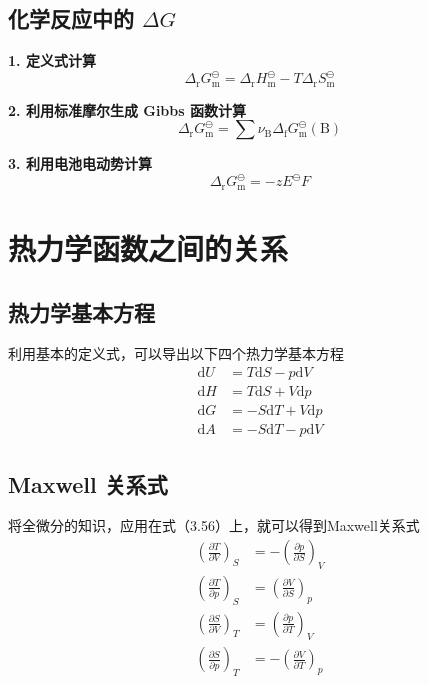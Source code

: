 \documentclass[lang=cn,newtx,10pt,scheme=chinese]{elegantbook}
\begin{document}
\subsection{化学反应中的 $\Delta G$}
\textbf{1. 定义式计算}
\begin{equation}
	\Delta_\mathrm{r}G^\ominus_\mathrm{m} = \Delta_\mathrm{r}H^\ominus_\mathrm{m}-T\Delta_\mathrm{r}S^\ominus_\mathrm{m}
\end{equation}

\textbf{2. 利用标准摩尔生成 Gibbs 函数计算}
\begin{equation}
	\Delta_\mathrm{r}G^\ominus _\mathrm{m}=\sum \nu _\mathrm{B}\Delta _\mathrm{f}G^\ominus _\mathrm{m}(\mathrm{B} )     
\end{equation}

\textbf{3. 利用电池电动势计算}
\begin{equation}
	\Delta_\mathrm{r}G^\ominus _\mathrm{m}=-zE^\ominus F
\end{equation}

\section{热力学函数之间的关系}
\subsection{热力学基本方程}
利用基本的定义式，可以导出以下四个热力学基本方程
\begin{equation}
	\begin{aligned}
		\mathrm{d}U &= T\mathrm{d}S-p\mathrm{d}V \\[1.5ex]
		\mathrm{d}H &= T\mathrm{d}S+V\mathrm{d}p \\[1.5ex]
		\mathrm{d}G &= -S\mathrm{d}T+V\mathrm{d}p \\[1.5ex]
		\mathrm{d}A &= -S\mathrm{d}T-p\mathrm{d}V
	\end{aligned}	
\end{equation}

\subsection{Maxwell 关系式}
将全微分的知识，应用在式（3.56）上，就可以得到Maxwell关系式
\begin{equation}
	\begin{aligned}
		\left ( \frac{\partial T}{\partial V}  \right )_S &= -\left ( \frac{\partial p}{\partial S}  \right )_V \\[1.5ex]
		\left ( \frac{\partial T}{\partial p}  \right )_S &= \left ( \frac{\partial V}{\partial S}  \right )_p \\[1.5ex]
		\left ( \frac{\partial S}{\partial V}  \right )_T &= \left ( \frac{\partial p}{\partial T}  \right )_V \\[1.5ex]
		\left ( \frac{\partial S}{\partial p}  \right )_T &= -\left ( \frac{\partial V}{\partial T}  \right )_p 
	\end{aligned}
\end{equation}
\end{document}
